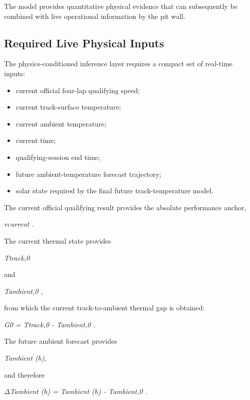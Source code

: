 The model provides quantitative physical evidence that can subsequently be combined with live operational information by the pit wall.

\subsection{Required Live Physical Inputs}
The physics-conditioned inference layer requires a compact set of real-time inputs:

\begin{itemize}
\item current official four-lap qualifying speed;
\item current track-surface temperature;
\item current ambient temperature;
\item current time;
\item qualifying-session end time;
\item future ambient-temperature forecast trajectory;
\item solar state required by the final future track-temperature model.
\end{itemize}

The current official qualifying result provides the absolute performance anchor,

\begin{center}\textit{vcurrent .}\end{center}

The current thermal state provides

\begin{center}\textit{Ttrack,0}\end{center}

and

\begin{center}\textit{Tambient,0 ,}\end{center}

from which the current track-to-ambient thermal gap is obtained:

\begin{center}\textit{G0 = Ttrack,0 - Tambient,0 .}\end{center}

The future ambient forecast provides

\begin{center}\textit{Tambient (h),}\end{center}

and therefore

\begin{center}\textit{\ensuremath{\Delta}Tambient (h) = Tambient (h) - Tambient,0 .}\end{center}

